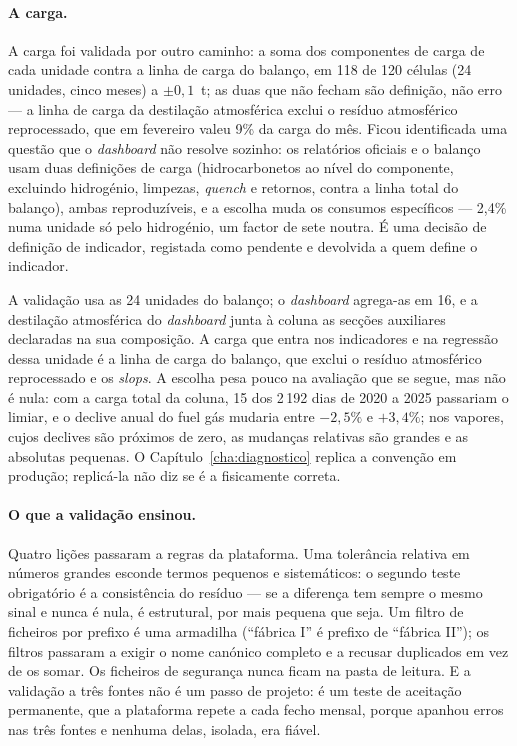\paragraph{A carga.} A carga foi validada por outro caminho: a soma dos
componentes de carga de cada unidade contra a linha de carga do balanço,
em 118 de 120 células (24 unidades, cinco meses) a $\pm0{,}1$~t; as duas
que não fecham são definição, não erro --- a linha de carga da destilação
atmosférica exclui o resíduo atmosférico reprocessado, que em fevereiro
valeu 9\% da carga do mês. Ficou identificada uma questão que o
\emph{dashboard} não resolve sozinho: os relatórios oficiais e o balanço
usam duas definições de carga (hidrocarbonetos ao nível do componente,
excluindo hidrogénio, limpezas, \emph{quench} e retornos, contra a linha
total do balanço), ambas reproduzíveis, e a escolha muda os consumos
específicos --- 2,4\% numa unidade só pelo hidrogénio, um factor de sete
noutra. É uma decisão de definição de indicador, registada como pendente
e devolvida a quem define o indicador.

A validação usa as 24 unidades do balanço; o \emph{dashboard} agrega-as em 16,
e a destilação atmosférica do \emph{dashboard} junta à coluna as secções
auxiliares declaradas na sua composição. A carga que entra nos indicadores
e na regressão dessa unidade é a linha de carga do balanço, que exclui o
resíduo atmosférico reprocessado e os \emph{slops}. A escolha pesa pouco na
avaliação que se segue, mas não é nula: com a carga total da coluna, 15 dos
2\,192 dias de 2020 a 2025 passariam o limiar, e o declive anual do fuel gás
mudaria entre $-2{,}5\%$ e $+3{,}4\%$; nos vapores, cujos declives são
próximos de zero, as mudanças relativas são grandes e as absolutas
pequenas. O Capítulo~\ref{cha:diagnostico} replica a convenção em produção;
replicá-la não diz se é a fisicamente correta.

\paragraph{O que a validação ensinou.} Quatro lições passaram a regras
da plataforma. Uma tolerância relativa em números grandes esconde termos
pequenos e sistemáticos: o segundo teste obrigatório é a consistência do
resíduo --- se a diferença tem sempre o mesmo sinal e nunca é nula, é
estrutural, por mais pequena que seja. Um filtro de ficheiros por prefixo
é uma armadilha (``fábrica I'' é prefixo de ``fábrica II''); os filtros
passaram a exigir o nome canónico completo e a recusar duplicados em vez
de os somar. Os ficheiros de segurança nunca ficam na pasta de leitura. E
a validação a três fontes não é um passo de projeto: é um teste de
aceitação permanente, que a plataforma repete a cada fecho mensal, porque
apanhou erros nas três fontes e nenhuma delas, isolada, era fiável.

